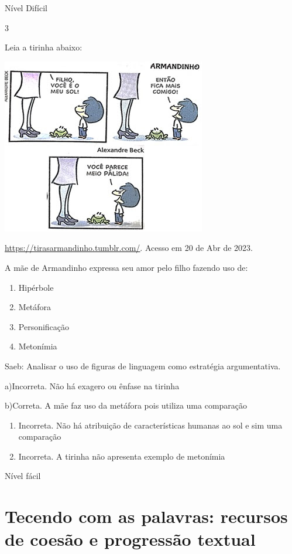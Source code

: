 {{Nível Difícil

\num{3}

Leia a tirinha abaixo:

\includegraphics[width=3.51042in,height=3.02083in]{./imgSAEB_7_POR/media/image14.png}

\href{https://tirasarmandinho.tumblr.com/}{\uline{https://tirasarmandinho.tumblr.com/}}.
Acesso em 20 de Abr de 2023.

A mãe de Armandinho expressa seu amor pelo filho fazendo uso de:

\begin{enumerate}
\def\labelenumi{\alph{enumi})}
\item
  Hipérbole
\item
  Metáfora
\item
  Personificação
\item
  Metonímia
\end{enumerate}

Saeb: Analisar o uso de figuras de linguagem como estratégia
argumentativa.

a)Incorreta. Não há exagero ou ênfase na tirinha

b)Correta. A mãe faz uso da metáfora pois utiliza uma comparação

\begin{enumerate}
\def\labelenumi{\arabic{enumi}.}
\item
  Incorreta. Não há atribuição de características humanas ao sol e sim
  uma comparação
\item
  Incorreta. A tirinha não apresenta exemplo de metonímia
\end{enumerate}

Nível fácil


\chapter{Tecendo com as palavras: recursos de coesão e progressão textual}

}}
